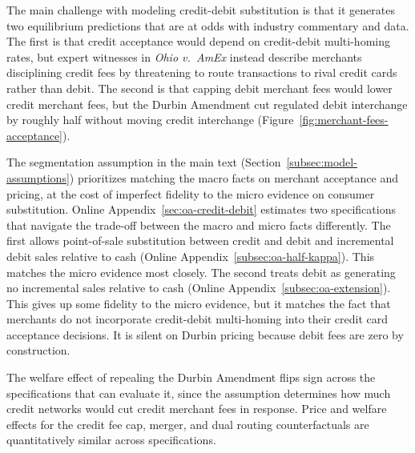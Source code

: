 \documentclass[main.tex]{subfiles}
\begin{document}
\begin{refsection}
The main challenge with modeling credit-debit substitution is that it generates two equilibrium predictions that are at odds with industry commentary and data.
The first is that credit acceptance would depend on credit-debit multi-homing rates, but expert witnesses in \emph{Ohio v.\ AmEx} instead describe merchants disciplining credit fees by threatening to route transactions to rival credit cards rather than debit.
The second is that capping debit merchant fees would lower credit merchant fees, but the Durbin Amendment cut regulated debit interchange by roughly half without moving credit interchange (Figure~\ref{fig:merchant-fees-acceptance}).

The segmentation assumption in the main text (Section~\ref{subsec:model-assumptions}) prioritizes matching the macro facts on merchant acceptance and pricing, at the cost of imperfect fidelity to the micro evidence on consumer substitution.
Online Appendix~\ref{sec:oa-credit-debit} estimates two specifications that navigate the trade-off between the macro and micro facts differently.
The first allows point-of-sale substitution between credit and debit and incremental debit sales relative to cash (Online Appendix~\ref{subsec:oa-half-kappa}).
This matches the micro evidence most closely.
The second treats debit as generating no incremental sales relative to cash (Online Appendix~\ref{subsec:oa-extension}).
This gives up some fidelity to the micro evidence, but it matches the fact that merchants do not incorporate credit-debit multi-homing into their credit card acceptance decisions.
It is silent on Durbin pricing because debit fees are zero by construction.

The welfare effect of repealing the Durbin Amendment flips sign across the specifications that can evaluate it, since the assumption determines how much credit networks would cut credit merchant fees in response.
Price and welfare effects for the credit fee cap, merger, and dual routing counterfactuals are quantitatively similar across specifications.


\end{refsection}
\end{document}
